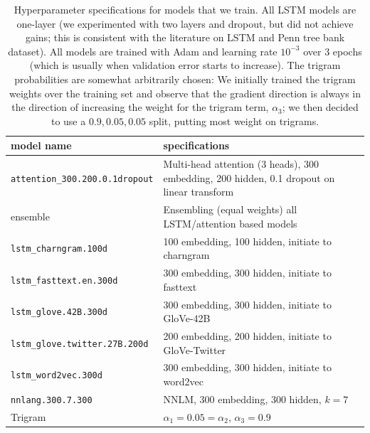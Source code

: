 \documentclass[12pt]{article}
\begin{document}
\begin{landscape}
\begin{table}[tb]
    
    \centering
\begin{tabular}{ll}
\toprule
model name                   &specifications\\
\midrule
\texttt{attention\_300.200.0.1dropout} & Multi-head attention (3 heads), 300 embedding, 200 hidden, 0.1 dropout on linear transform\\
ensemble                     & Ensembling (equal weights) all LSTM/attention based models\\
\texttt{lstm\_charngram.100d }         & 100 embedding, 100 hidden, initiate to charngram \\
\texttt{lstm\_fasttext.en.300d }       & 300 embedding, 300 hidden, initiate to fasttext \\
\texttt{lstm\_glove.42B.300d    }      & 300 embedding, 300 hidden, initiate to GloVe-42B \\
\texttt{lstm\_glove.twitter.27B.200d}  & 200 embedding, 200 hidden, initiate to GloVe-Twitter \\
\texttt{lstm\_word2vec.300d         }  & 300 embedding, 300 hidden, initiate to word2vec \\
\texttt{nnlang.300.7.300            } & NNLM, 300 embedding, 300 hidden, $k=7$\\
Trigram & $\alpha_1 = 0.05 = \alpha_2$, $\alpha_3 = 0.9$\\
\bottomrule
\end{tabular}
    \caption{Hyperparameter specifications for models that we train. All LSTM
    models are one-layer (we experimented with two layers and dropout, but did
    not achieve gains; this is consistent with the literature on LSTM and Penn tree bank dataset). All models are trained with Adam and learning rate
    $10^{-3}$ over 3 epochs (which is usually when validation error starts to
    increase). The trigram probabilities are somewhat arbitrarily chosen: We
    initially trained the trigram weights over the training set and observe
    that the gradient direction is always in the direction of increasing the
    weight for the trigram term, $\alpha_3$; we then decided to use a $0.9,
    0.05,0.05$ split, putting most weight on trigrams.}
    \label{tab:spec}
\end{table}
\end{landscape}
\end{document}
